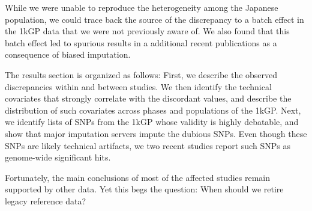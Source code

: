 \documentclass[9pt,lineno]{elife}
\begin{document}
While we were unable to reproduce the heterogeneity among the Japanese population, we could trace back the source of the discrepancy to a batch effect in the 1kGP data that we were not previously aware of.
We also found that this batch effect led to spurious results in a additional recent publications as a consequence of biased imputation. 

The results section is organized as follows:
First, we describe the observed discrepancies within and between studies. We then identify the technical covariates that strongly correlate with the discordant values, and describe the distribution of such covariates across phases and populations of the 1kGP.    
Next, we identify lists of SNPs from the 1kGP whose validity is highly debatable, and show that major imputation servers impute the dubious SNPs.  
Even though these SNPs are likely technical artifacts, we two recent studies report such SNPs as genome-wide significant hits.   

Fortunately, the main conclusions of most of the affected studies remain supported by other data. Yet this begs the question: When should we retire legacy reference data?
\end{document}
